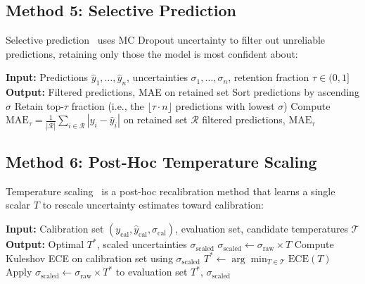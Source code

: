 \subsection{Method 5: Selective Prediction}

Selective prediction~\cite{geifman2017selective} uses MC Dropout uncertainty to filter out unreliable predictions, retaining only those the model is most confident about:

\begin{algorithm}[htbp]
\caption[Selective prediction via uncertainty filtering]{Selective prediction. Predictions are ranked by MC Dropout uncertainty and only the most confident fraction is retained.}
\label{alg:selective}
\begin{algorithmic}
\STATE \textbf{Input:} Predictions $\hat{y}_1, \ldots, \hat{y}_n$, uncertainties $\sigma_1, \ldots, \sigma_n$, retention fraction $\tau \in (0, 1]$
\STATE \textbf{Output:} Filtered predictions, MAE on retained set
\STATE Sort predictions by ascending $\sigma$
\STATE Retain top-$\tau$ fraction (i.e., the $\lfloor \tau \cdot n \rfloor$ predictions with lowest $\sigma$)
\STATE Compute $\text{MAE}_\tau = \frac{1}{|\mathcal{R}|}\sum_{i \in \mathcal{R}} |y_i - \hat{y}_i|$ on retained set $\mathcal{R}$
\RETURN filtered predictions, $\text{MAE}_\tau$
\end{algorithmic}
\end{algorithm}

\subsection{Method 6: Post-Hoc Temperature Scaling}

Temperature scaling~\cite{guo2017calibration, laves2020well} is a post-hoc recalibration method that learns a single scalar $T$ to rescale uncertainty estimates toward calibration:

\begin{algorithm}[htbp]
\caption[Post-hoc temperature scaling for uncertainty calibration]{Post-hoc temperature scaling. A single temperature parameter $T$ is optimised on a calibration set to minimise the Expected Calibration Error (ECE).}
\label{alg:temperature}
\begin{algorithmic}
\STATE \textbf{Input:} Calibration set $(y_\text{cal}, \hat{y}_\text{cal}, \sigma_\text{cal})$, evaluation set, candidate temperatures $\mathcal{T}$
\STATE \textbf{Output:} Optimal $T^*$, scaled uncertainties $\sigma_\text{scaled}$
    \STATE $\sigma_\text{scaled} \leftarrow \sigma_\text{raw} \times T$
    \STATE Compute Kuleshov ECE on calibration set using $\sigma_\text{scaled}$
\ENDFOR
\STATE $T^* \leftarrow \arg\min_{T \in \mathcal{T}} \text{ECE}(T)$
\STATE Apply $\sigma_\text{scaled} \leftarrow \sigma_\text{raw} \times T^*$ to evaluation set
\RETURN $T^*$, $\sigma_\text{scaled}$
\end{algorithmic}
\end{algorithm}

